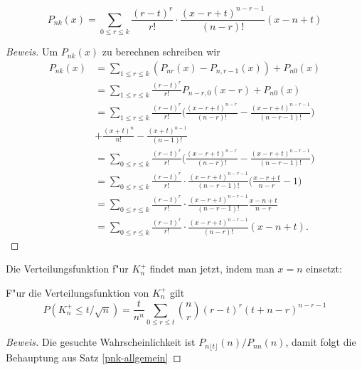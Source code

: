\begin{satz}\label{pnk-allgemein}
\begin{equation}
P_{nk}(x)
=
\sum_{0\le r\le k}\frac{(r-t)^r}{r!}
\cdot
\frac{(x-r+t)^{n-r-1}}{(n-r)!}
(x-n+t)
\end{equation}
\end{satz}
\begin{proof}[Beweis]
Um $P_{nk}(x)$ zu berechnen schreiben wir
\begin{align*}
P_{nk}(x)
&=
\sum_{1\le r\le k}(P_{nr}(x)-P_{n,r-1}(x))+P_{n0}(x)
\\
&=
\sum_{1\le r\le k}\frac{(r-t)^r}{r!}P_{n-r,0}(x-r)+P_{n0}(x)
\\
&=
\sum_{1\le r\le k}\frac{(r-t)^r}{r!}\biggl(
\frac{(x-r+t)^{n-r}}{(n-r)!}-
\frac{(x-r+t)^{n-r-1}}{(n-r-1)!}\biggr)
\\
&
+\frac{(x+t)^{n}}{n!}- \frac{(x+t)^{n-1}}{(n-1)!}
\\
&=
\sum_{0\le r\le k}\frac{(r-t)^r}{r!}\biggl(
\frac{(x-r+t)^{n-r}}{(n-r)!}-
\frac{(x-r+t)^{n-r-1}}{(n-r-1)!}\biggr)
\\
&=
\sum_{0\le r\le k}\frac{(r-t)^r}{r!}
\cdot
\frac{(x-r+t)^{n-r-1}}{(n-r-1)!}
\biggl( \frac{x-r+t}{n-r}-1 \biggr)
\\
&=
\sum_{0\le r\le k}\frac{(r-t)^r}{r!}
\cdot
\frac{(x-r+t)^{n-r-1}}{(n-r-1)!}
\frac{x-n+t}{n-r}
\\
&=
\sum_{0\le r\le k}\frac{(r-t)^r}{r!}
\cdot
\frac{(x-r+t)^{n-r-1}}{(n-r)!}
(x-n+t).
\end{align*}
\end{proof}
Die Verteilungsfunktion f"ur $K_n^+$ findet man jetzt, indem man $x=n$
einsetzt:

\begin{satz}\label{kn-verteilung}
F"ur die Verteilungsfunktion von $K_n^+$ gilt
\begin{equation}
P(K_n^+\le t/\sqrt{n})=\frac{t}{n^n}\sum_{0\le r\le t}\binom{n}{r}(r-t)^r(t+n-r)^{n-r-1}
\end{equation}
\end{satz}
\begin{proof}[Beweis]
Die gesuchte Wahrscheinlichkeit ist $P_{n\lfloor t\rfloor}(n)/P_{nn}(n)$,
damit folgt die Behauptung aus Satz \ref{pnk-allgemein}
\end{proof}

